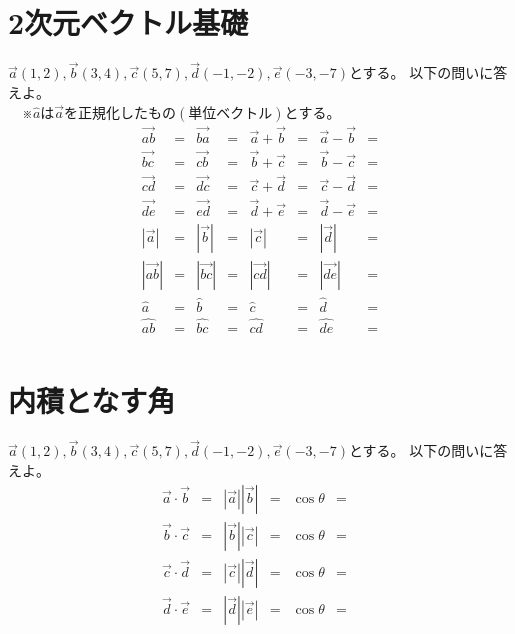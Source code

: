 \documentclass[paper=b4j,landscape,twocolumn,fleqn]{jlreq}
\begin{document}
\section{2次元ベクトル基礎}
$\vec{a}(1,2),　\vec{b}(3,4),　\vec{c}(5,7),　\vec{d}(-1,-2),　\vec{e}(-3,-7)$とする。
以下の問いに答えよ。\\
　※$\hat{a}は\vec{a}を正規化したもの(単位ベクトル)とする。$
\begin{align*}
\vec{ab} &= & \vec{ba} &= & \vec{a}+\vec{b} &= & \vec{a}-\vec{b} &= \\
\vec{bc} &= & \vec{cb} &= & \vec{b}+\vec{c} &= & \vec{b}-\vec{c} &= \\ 
\vec{cd} &= & \vec{dc} &= & \vec{c}+\vec{d} &= & \vec{c}-\vec{d} &= \\ 
\vec{de} &= & \vec{ed} &= & \vec{d}+\vec{e} &= & \vec{d}-\vec{e} &= \\
|\vec{a}| &= & |\vec{b}| &= & |\vec{c}| &= & |\vec{d}| &= \\
|\vec{ab}| &= & |\vec{bc}| &= & |\vec{cd}| &= & |\vec{de}| &= \\
\hat{a} &= & \hat{b} &= & \hat{c} &= & \hat{d} &= \\
\hat{ab} &= & \hat{bc} &= & \hat{cd} &= & \hat{de} &= \\
\end{align*}
\section{内積となす角}  
$\vec{a}(1,2),　\vec{b}(3,4),　\vec{c}(5,7),　\vec{d}(-1,-2),　\vec{e}(-3,-7)$とする。
以下の問いに答えよ。\\
\begin{align*}
\vec{a} \cdot \vec{b} &= & |\vec{a}||\vec{b}| &= & \cos\theta &= &\\
\vec{b} \cdot \vec{c} &= & |\vec{b}||\vec{c}| &= & \cos\theta &= &\\
\vec{c} \cdot \vec{d} &= & |\vec{c}||\vec{d}| &= & \cos\theta &= &\\
\vec{d} \cdot \vec{e} &= & |\vec{d}||\vec{e}| &= & \cos\theta &= &\\
\end{align*}
\end{document}
